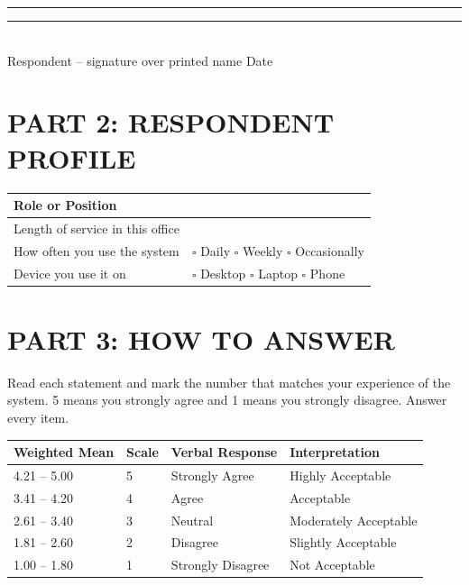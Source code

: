 \documentclass[12pt, a4paper]{report}
\begin{document}
\vspace{1cm}
\noindent \rule{7cm}{0.5pt} \hfill \rule{5cm}{0.5pt} \\
\noindent Respondent -- signature over printed name \hfill Date

\vspace{0.5cm}

\section*{PART 2: RESPONDENT PROFILE}
\begin{tabular}{|p{6cm}|p{9cm}|}
\hline
Role or Position & \\
\hline
Length of service in this office & \\
\hline
How often you use the system & $\square$ Daily \quad $\square$ Weekly \quad $\square$ Occasionally \\
\hline
Device you use it on & $\square$ Desktop \quad $\square$ Laptop \quad $\square$ Phone \\
\hline
\end{tabular}

\vspace{0.5cm}

\section*{PART 3: HOW TO ANSWER}
Read each statement and mark the number that matches your experience of the system. 5 means you strongly agree and 1 means you strongly disagree. Answer every item.

\vspace{0.3cm}

\begin{tabular}{|p{2.5cm}|p{1cm}|p{4cm}|p{6cm}|}
\hline
\textbf{Weighted Mean} & \textbf{Scale} & \textbf{Verbal Response} & \textbf{Interpretation} \\
\hline
4.21 -- 5.00 & 5 & Strongly Agree & Highly Acceptable \\
\hline
3.41 -- 4.20 & 4 & Agree & Acceptable \\
\hline
2.61 -- 3.40 & 3 & Neutral & Moderately Acceptable \\
\hline
1.81 -- 2.60 & 2 & Disagree & Slightly Acceptable \\
\hline
1.00 -- 1.80 & 1 & Strongly Disagree & Not Acceptable \\
\hline
\end{tabular}
\end{document}
